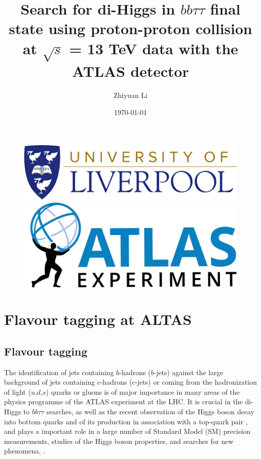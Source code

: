 \documentclass[letterpaper,12pt]{article}
\begin{document}
\title{Search for di-Higgs in $bb\tau\tau$ final state using proton-proton collision at $\sqrt{s}$ = 13 TeV data with the ATLAS detector}%
\author{ Zhiyuan Li}
\date{\today}
\maketitle
\begin{figure}[htp]
\begin{minipage}[b]{.5\textwidth}
\centering
\includegraphics[width=1\textwidth]{logo.png}
\end{minipage}\hfill
\begin{minipage}[b]{.45\textwidth}
\vspace{3em}
\centering
\includegraphics[width=1\textwidth]{ATLAS-Logo-Ref-RGB-H_1.jpg}
\end{minipage}
\end{figure}
\newpage


\tableofcontents{}
\printindex{}


\newpage
\section{Flavour tagging at ALTAS}


\subsection{Flavour tagging}


The identification of jets containing $b$-hadrons ($b$-jets) 
against the large background of jets containing $c$-hadrons 
($c$-jets) or coming from the hadronization of light ($u$,$d$,$s$) 
quarks or gluons is of major importance in many areas of the 
physics programme of the ATLAS experiment at the LHC. It is 
crucial in the di-Higgs to $bb\tau\tau$ searches, as well as the recent 
observation of the Higgs boson decay into bottom quarks \cite{HIGG-2018-04} 
and of its production in association with a top-quark pair \cite{HIGG-2018-13}, 
and plays a important role in a large number of Standard Model (SM) 
precision measurements, studies of the Higgs boson properties, and 
searches for new phenomena\cite{SUSY-2014-08}, \cite{ATLAS-CONF-2018-043} \cite{Interpreting Higgs result}.
\end{document}
